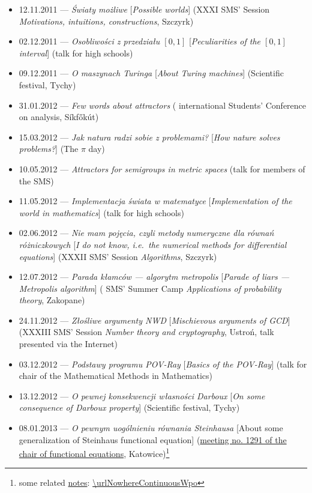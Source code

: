 \begin{itemize}
  \item 12.11.2011 --- \textsl{Światy możliwe} [\textsl{Possible worlds}] (XXXI SMS' Session \textsl{Motivations, intuitions, constructions}, Szczyrk)
  \item 02.12.2011 --- \textsl{Osobliwości z przedziału $[0, 1]$} [\textsl{Peculiarities of the $[0,1]$ interval}] (talk for high schools)
  \item 09.12.2011 --- \textsl{O maszynach Turinga} [\textsl{About Turing machines}] (Scientific festival, Tychy)
  \item 31.01.2012 --- \textsl{Few words about attractors} ( international Students' Conference on analysis, Síkfőkút)
  \item 15.03.2012 --- \textsl{Jak natura radzi sobie z problemami?} [\textsl{How nature solves problems?}] (The $\pi$ day)
  \item 10.05.2012 --- \textsl{Attractors for semigroups in metric spaces} (talk for members of the SMS)
  \item 11.05.2012 --- \textsl{Implementacja świata w matematyce} [\textsl{Implementation of the world in mathematics}] (talk for high schools)
  \item 02.06.2012 --- \textsl{Nie mam pojęcia, czyli metody numeryczne dla równań różniczkowych} [\textsl{I do not know, i.e.\ the numerical methods for differential equations}] (XXXII SMS' Session \textsl{Algorithms}, Szczyrk)
  \item 12.07.2012 --- \textsl{Parada kłamców --- algorytm metropolis} [\textsl{Parade of liars ---  Metropolis algorithm}] ( SMS' Summer Camp \textsl{Applications of probability theory}, Zakopane)
  \item 24.11.2012 --- \textsl{Złośliwe argumenty NWD} [\textsl{Mischievous arguments of GCD}] (XXXIII SMS' Session \textsl{Number theory and cryptography}, Ustroń, talk presented via the Internet)
  \item 03.12.2012 --- \textsl{Podstawy programu POV-Ray} [\textsl{Basics of the POV-Ray}] (talk for chair of the Mathematical Methods in Mathematics)
  \item 13.12.2012 --- \textsl{O pewnej konsekwencji własności Darboux} [\textsl{On some consequence of Darboux property}] (Scientific festival, Tychy)
  \item 08.01.2013 --- \textsl{O pewnym uogólnieniu równania Steinhausa} [About some generalization of Steinhaus functional equation] (\href{http://www.math.us.edu.pl/seminariaRF/archiwum_rf/zrf1213.html}{meeting no. 1291 of the chair of functional equations}, Katowice)\footnote{some related \href{\urlNowhereContinuousWpoPdf}{notes}: \url{\urlNowhereContinuousWpo}}

\end{itemize}
